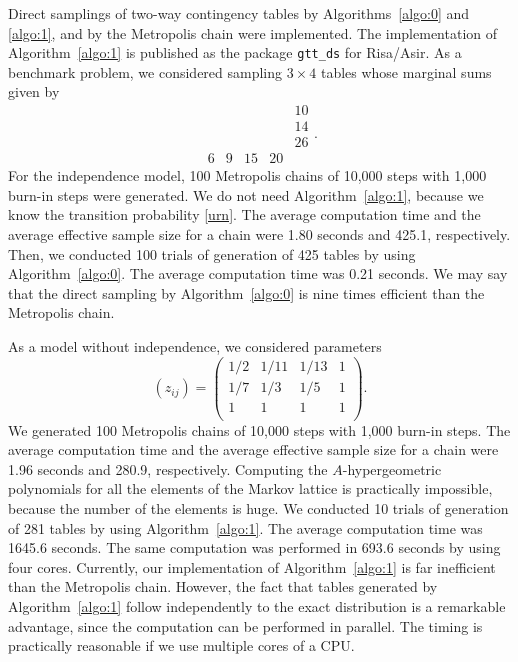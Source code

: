 \documentclass[a4paper,12pt]{article}
\theoremstyle{plain}
\theoremstyle{remark}
\begin{document}
Direct samplings of two-way contingency tables by
Algorithms~\ref{algo:0} and \ref{algo:1}, and by
the Metropolis chain were implemented. The implementation
of Algorithm~\ref{algo:1} is published as the package
{\tt gtt\_ds} for Risa/Asir. As a benchmark problem, we
considered sampling $3\times 4$ tables whose marginal sums
given by
\[
  \begin{array}{cccc|c}
    & &  &  &10\\
    & &  &  &14\\
    & &  &  &26\\
    \hline
    6&9&15&20&
  \end{array}.
\]
For the independence model, 100 Metropolis chains of 10,000
steps with 1,000 burn-in steps were generated. We do not need
Algorithm~\ref{algo:1}, because we know the transition
probability \eqref{urn}. The average
computation time and the average effective sample size for
a chain were 1.80 seconds and 425.1, respectively. Then, we
conducted 100 trials of generation of 425 tables by using
Algorithm~\ref{algo:0}. The average computation time was
0.21 seconds. We may say that the direct sampling by
Algorithm~\ref{algo:0} is nine times efficient than
the Metropolis chain.

As a model without independence, we
considered parameters
\[
  (z_{ij})=\left(
  \begin{array}{cccc}
    1/2&1/11&1/13&1\\
    1/7&1/3 &1/5 &1\\
    1  &1   &1   &1\\
  \end{array}
  \right).
\]
We generated 100 Metropolis chains of 10,000 steps with 1,000
burn-in steps. The average computation time and the average
effective sample size for a chain were 1.96 seconds and 280.9,
respectively. Computing the $A$-hypergeometric polynomials
for all the elements of the Markov lattice is practically
impossible, because the number of the elements is huge.
We conducted 10 trials of generation of 281 tables by using
Algorithm~\ref{algo:1}. The average computation time was
1645.6 seconds. The same computation was performed in 693.6
seconds by using four cores. Currently, our implementation of 
Algorithm~\ref{algo:1} is far inefficient than the Metropolis
chain. However, the fact that tables generated by
Algorithm~\ref{algo:1} follow independently to the exact
distribution is a remarkable advantage, since the computation
can be performed in parallel. The timing is
practically reasonable if we use multiple cores of a CPU.
\end{document}
